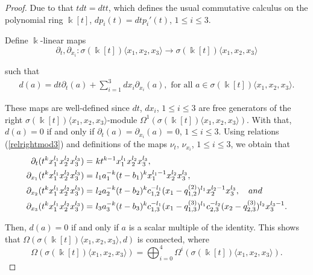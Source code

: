 \documentclass{amsart}
\theoremstyle{definition}
\theoremstyle{remark}
\numberwithin{equation}{section}
\begin{document}
\begin{proof}
Due to that $t dt=dt t$, which defines the usual commutative calculus on the polynomial ring $\Bbbk[t]$, $dp_i(t) = dtp_i'(t)$, $1 \leq i \leq 3$.

Define $\Bbbk$-linear maps $$
\partial_t, \partial_{x_i}: \sigma(\Bbbk[t])\langle x_1, x_2, x_3\rangle \rightarrow \sigma(\Bbbk[t])\langle x_1, x_2, x_3\rangle
$$ 

such that
\begin{align*}
d(a)=dt\partial_t(a)+\sum_{i=1}^{3}dx_i\partial_{x_i}(a), \text{ for all } a \in \sigma(\Bbbk[t])\langle x_1, x_2, x_3\rangle.
\end{align*}

These maps are well-defined since $dt$, $dx_i$, $1\leq i \leq 3$ are free generators of the right $\sigma(\Bbbk[t])\langle x_1, x_2, x_3\rangle$-module $\Omega^1(\sigma(\Bbbk[t])\langle x_1, x_2, x_3\rangle)$. With that, $d(a)=0$ if and only if $\partial_t(a)=\partial_{x_i}(a)=0$, $1 \leq i \leq 3$. Using relations {\rm (}\ref{relrightmod3}{\rm )} and definitions of the maps $\nu_t$, $\nu_{x_i}$, $1 \leq i \leq 3$, we obtain that
\begin{align}
\partial_t(t^kx_1^{l_1}x_2^{l_2}x_3^{l_3}) = &\ kt^{k-1}x_1^{l_1}x_2^{l_2}x_3^{l_3}, \\
\partial_{x_1}(t^kx_1^{l_1}x_2^{l_2}x_3^{l_3}) = &\ l_{1}a_1^{-k}(t-b_1)^kx_1^{l_1-1}x_{2}^{l_{2}}x_3^{l_3}, \notag \\
\partial_{x_2}(t^kx_1^{l_1}x_2^{l_2}x_3^{l_3}) = &\ l_{2}a_2^{-k}(t-b_2)^kc_{1,2}^{-l_1}(x_1-q_{1,2}^{(2)})^{l_1}x_2^{l_2-1}x_{3}^{l_{3}}, \quad {\rm and} \notag \\
\partial_{x_3}(t^kx_1^{l_1}x_2^{l_2}x_3^{l_3}) = &\ l_{3}a_3^{-k}(t-b_3)^kc_{1,3}^{-l_1}(x_1-q_{1,3}^{(3)})^{l_1}c_{2,3}^{-l_2}(x_2-q_{2,3}^{(3)})^{l_2} x_3^{l_3-1}. \notag
\end{align}

Then, $d(a)=0$ if and only if $a$ is a scalar multiple of the identity. This shows that $\Omega(\sigma(\Bbbk[t])\langle x_1, x_2, x_3\rangle,d)$ is connected, where 
\[
\Omega(\sigma(\Bbbk[t])\langle x_1, x_2, x_3\rangle) = \bigoplus_{i=0}^{4}\Omega^i(\sigma(\Bbbk[t])\langle x_1, x_2, x_3\rangle).
\]


\end{proof}
\end{document}
